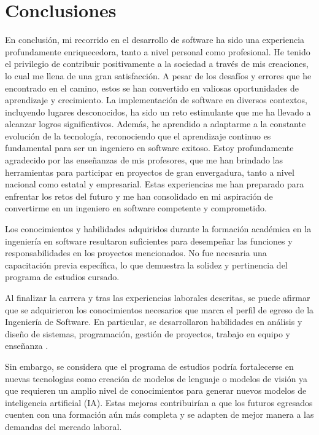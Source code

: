 \documentclass[protocolo.tex]{subfiles}
\begin{document}
\section{Conclusiones}
En conclusión, mi recorrido en el desarrollo de software ha sido una experiencia
profundamente enriquecedora, tanto a nivel personal como profesional. He tenido el
privilegio de contribuir positivamente a la sociedad a través de mis creaciones, lo cual me
llena de una gran satisfacción. A pesar de los desafíos y errores que he encontrado en el
camino, estos se han convertido en valiosas oportunidades de aprendizaje y crecimiento.
La implementación de software en diversos contextos, incluyendo lugares desconocidos, ha
sido un reto estimulante que me ha llevado a alcanzar logros significativos. Además, he
aprendido a adaptarme a la constante evolución de la tecnología, reconociendo que el
aprendizaje continuo es fundamental para ser un ingeniero en software exitoso.
Estoy profundamente agradecido por las enseñanzas de mis profesores, que me han
brindado las herramientas para participar en proyectos de gran envergadura, tanto a nivel
nacional como estatal y empresarial. Estas experiencias me han preparado para enfrentar
los retos del futuro y me han consolidado en mi aspiración de convertirme en un ingeniero
en software competente y comprometido.

Los conocimientos y habilidades adquiridos durante la formación académica en la ingeniería en software resultaron suficientes para desempeñar las funciones y responsabilidades en los proyectos mencionados.  No fue necesaria una capacitación previa específica, lo que demuestra la solidez y pertinencia del programa de estudios cursado.

Al finalizar la carrera y tras las experiencias laborales descritas, se puede afirmar que se  adquirieron los conocimientos necesarios que marca el perfil de egreso de la Ingeniería de Software. En particular, 
se desarrollaron habilidades en análisis y diseño de sistemas, programación, gestión de proyectos, trabajo en equipo y enseñanza .

Sin embargo, se considera que el programa de estudios podría fortalecerse en nuevas tecnologias como creación de modelos de lenguaje o modelos de visión ya que requieren un amplio nivel de conocimientos para generar nuevos modelos de inteligencia artificial (IA).  Estas mejoras contribuirían a que los futuros egresados cuenten con una formación aún más completa y  se  adapten  de  mejor  manera  a  las  demandas  del  mercado  laboral.
\end{document}
